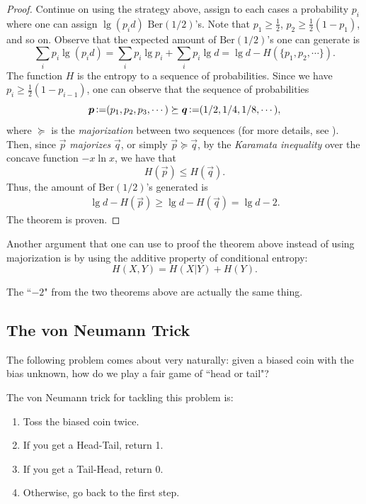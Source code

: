 \begin{proof}
    Continue on using the strategy above, assign to each cases a probability $p_i$ where one can assign $\lg(p_id)$ $\mathrm{Ber}(1/2)$'s. Note that $p_1\ge\frac{1}{2}$, $p_2\ge \frac{1}{2}(1-p_1)$, and so on. Observe that the expected amount of $\mathrm{Ber}(1/2)$'s one can generate is
    \begin{equation*}
        \sum_i p_i\lg(p_id) = \sum_i p_i\lg p_i + \sum_i p_i\lg d = \lg d - H(\{p_1,p_2,\cdots\}).
    \end{equation*}  
    The function $H$ is the entropy to a sequence of probabilities. Since we have $p_i \ge \frac{1}{2}(1-p_{i-1})$, one can observe that the sequence of probabilities
    \begin{equation*}
        \boldsymbol{p} \operatorname{\vcentcolon=} (p_1,p_2,p_3,\cdots) \succeq \boldsymbol{q} \operatorname{\vcentcolon=} (1/2,1/4,1/8,\cdots),
    \end{equation*}
    where $\succeq$ is the \textit{majorization} between two sequences (for more details, see ). Then, since $\vec{p}$ \textit{majorizes} $\vec{q}$, or simply $\vec{p}\succeq\vec{q}$, by the \textit{Karamata inequality} over the concave function $-x\ln x$, we have that
    \begin{equation*}
        H(\vec{p}) \le H(\vec{q}).
    \end{equation*}
    Thus, the amount of $\mathrm{Ber}(1/2)$'s generated is
    \begin{align*}
        \lg d - H(\vec{p}) \ge \lg d - H(\vec{q}) = \lg d - 2.
    \end{align*}
    The theorem is proven.
\end{proof}
Another argument that one can use to proof the theorem above instead of using majorization is by using the additive property of conditional entropy:
\begin{equation}
    H(X,Y) = H(X\vert Y) + H(Y).
\end{equation}

\begin{remark}
    The ``$-2$" from the two theorems above are actually the same thing.
\end{remark}

\subsection{The von Neumann Trick}
The following problem comes about very naturally: given a biased coin with the bias unknown, how do we play a fair game of ``head or tail"? 

The von Neumann trick for tackling this problem is:
\begin{enumerate}
    \item Toss the biased coin twice.
    \item If you get a Head-Tail, return 1.
    \item If you get a Tail-Head, return 0.
    \item Otherwise, go back to the first step.
\end{enumerate}


